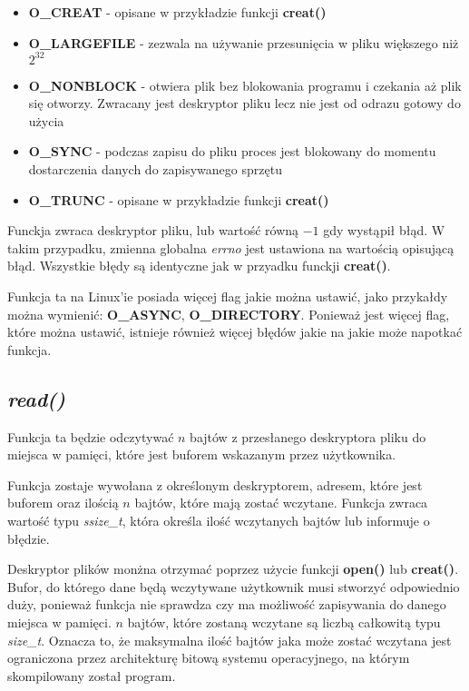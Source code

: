 \documentclass{article}
\begin{document}
\begin{itemize}
\item \textbf{O\_CREAT} - opisane w przykładzie funkcji \textbf{creat()}
\item \textbf{O\_LARGEFILE} - zezwala na używanie przesunięcia w pliku większego niż $2^{32}$
\item \textbf{O\_NONBLOCK} - otwiera plik bez blokowania programu i czekania aż plik się otworzy. Zwracany jest deskryptor pliku lecz nie jest od odrazu gotowy do użycia
\item \textbf{O\_SYNC} - podczas zapisu do pliku proces jest blokowany do momentu dostarczenia danych do zapisywanego sprzętu
\item \textbf{O\_TRUNC} - opisane w przykładzie funkcji \textbf{creat()}
\end{itemize}

Funckja zwraca deskryptor pliku, lub wartość równą $-1$ gdy wystąpił błąd.
W takim przypadku, zmienna globalna \textit{errno} jest ustawiona na wartością opisującą błąd.
Wszystkie błędy są identyczne jak w przyadku funckji \textbf{creat()}.

Funkcja ta na Linux'ie posiada więcej flag jakie można ustawić, jako przykałdy można wymienić: \textbf{O\_ASYNC}, \textbf{O\_DIRECTORY}.
Ponieważ jest więcej flag, które można ustawić, istnieje również więcej błędów jakie na jakie może napotkać funkcja. 

\subsection{\textit{read()}}
Funkcja ta będzie odczytywać $n$ bajtów z przesłanego deskryptora pliku do miejsca w pamięci,
które jest buforem wskazanym przez użytkownika.

Funkcja zostaje wywołana z określonym deskryptorem, adresem, które jest buforem oraz ilością $n$ bajtów, które mają zostać wczytane. Funkcja zwraca wartość typu \textit{ssize\_t}, która określa ilość wczytanych bajtów lub informuje o błędzie.

Deskryptor plików monżna otrzymać poprzez użycie funkcji \textbf{open()} lub \textbf{creat()}.
Bufor, do którego dane będą wczytywane użytkownik musi stworzyć odpowiednio duży, ponieważ funkcja nie sprawdza czy ma możliwość zapisywania do danego miejsca w pamięci.
$n$ bajtów, które zostaną wczytane są liczbą całkowitą typu \textit{size\_t}.
Oznacza to, że maksymalna ilość bajtów jaka może zostać wczytana jest ograniczona przez architekturę bitową systemu operacyjnego, na którym skompilowany został program.
\end{document}
